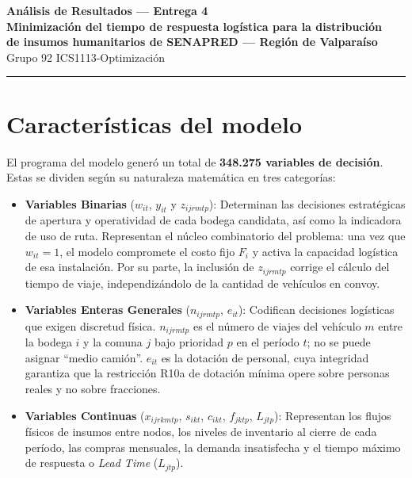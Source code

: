 \documentclass[letterpaper]{article}
\begin{document}
\begin{center}
{\Large\bf Análisis de Resultados --- Entrega 4}\\[4pt]
{\large\bf Minimización del tiempo de respuesta logística para la distribución}\\[2pt]
{\large\bf de insumos humanitarios de SENAPRED --- Región de Valparaíso}\\[4pt]
{\normalsize Grupo 92 \quad ICS1113-Optimización}
\end{center}
\hrule\vspace{6pt}
\tableofcontents
\newpage

\section{Características del modelo}

El programa del modelo generó un total de \textbf{348.275 variables de decisión}. Estas se
dividen según su naturaleza matemática en tres categorías:

\begin{itemize}[leftmargin=2em, itemsep=3pt]
  \item \textbf{Variables Binarias} ($w_{it}$, $y_{it}$ y $z_{ijrmtp}$): Determinan las decisiones
    estratégicas de apertura y operatividad de cada bodega candidata, así como la indicadora de uso de ruta.
    Representan el núcleo combinatorio del problema: una vez
    que $w_{it}=1$, el modelo compromete el costo fijo $F_i$ y activa la
    capacidad logística de esa instalación. Por su parte, la inclusión de $z_{ijrmtp}$ corrige el cálculo
    del tiempo de viaje, independizándolo de la cantidad de vehículos en convoy.
  \item \textbf{Variables Enteras Generales} ($n_{ijrmtp}$, $e_{it}$): Codifican
    decisiones logísticas que exigen discretud física. $n_{ijrmtp}$ es el número
    de viajes del vehículo $m$ entre la bodega $i$ y la comuna $j$ bajo
    prioridad $p$ en el período $t$; no se puede asignar ``medio camión''.
    $e_{it}$ es la dotación de personal, cuya integridad garantiza que la
    restricción R10a de dotación mínima opere sobre personas reales y no sobre
    fracciones.
  \item \textbf{Variables Continuas} ($x_{ijrkmtp}$, $s_{ikt}$, $c_{ikt}$,
    $f_{jktp}$, $L_{jtp}$): Representan los flujos físicos de insumos entre nodos, los
    niveles de inventario al cierre de cada período, las compras mensuales, la
    demanda insatisfecha y el tiempo máximo de respuesta o \textit{Lead Time} ($L_{jtp}$).
\end{itemize}
\end{document}
